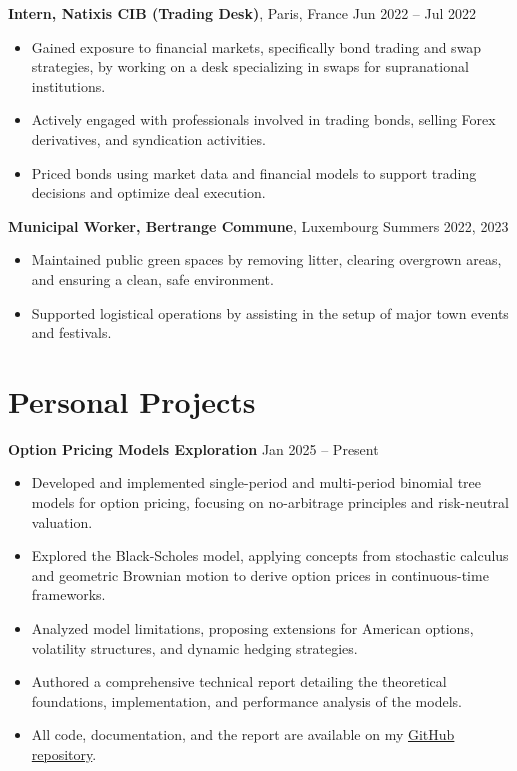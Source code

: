 \documentclass[10pt, letterpaper]{article}
\newenvironment{highlights}{
    \begin{itemize}[topsep=0.10cm, parsep=0.10cm, partopsep=0pt, itemsep=0pt, leftmargin=10pt]
}{
    \end{itemize}
}
\begin{document}
\textbf{Intern, Natixis CIB (Trading Desk)}, Paris, France \hfill Jun 2022 -- Jul 2022 \\
\begin{highlights}
    \item Gained exposure to financial markets, specifically bond trading and swap strategies, by working on a desk specializing in swaps for supranational institutions.
    \item Actively engaged with professionals involved in trading bonds, selling Forex derivatives, and syndication activities.
    \item Priced bonds using market data and financial models to support trading decisions and optimize deal execution.
\end{highlights}

\textbf{Municipal Worker, Bertrange Commune}, Luxembourg \hfill Summers 2022, 2023 \\
\begin{highlights}
    \item Maintained public green spaces by removing litter, clearing overgrown areas, and ensuring a clean, safe environment.
    \item Supported logistical operations by assisting in the setup of major town events and festivals.
\end{highlights}

\section{Personal Projects}
\textbf{Option Pricing Models Exploration} \hfill Jan 2025 -- Present \\
\begin{highlights}
    \item Developed and implemented single-period and multi-period binomial tree models for option pricing, focusing on no-arbitrage principles and risk-neutral valuation.
    \item Explored the Black-Scholes model, applying concepts from stochastic calculus and geometric Brownian motion to derive option prices in continuous-time frameworks.
    \item Analyzed model limitations, proposing extensions for American options, volatility structures, and dynamic hedging strategies.
    \item Authored a comprehensive technical report detailing the theoretical foundations, implementation, and performance analysis of the models.
    \item All code, documentation, and the report are available on my \href{https://github.com/tombeauge}{GitHub repository}.
\end{highlights} 
\end{document}
